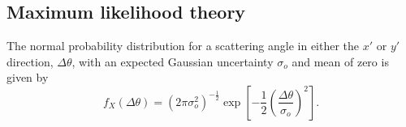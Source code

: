 \documentclass[a4paper,11pt]{article}
\begin{document}














\subsection{Maximum likelihood theory}\label{likelihood_theory_section}

The normal probability distribution for a scattering angle in either the $x'$ or $y'$ direction, $\Delta\theta$, with an expected Gaussian uncertainty $\sigma_o$ and mean of zero is given by
\begin{equation}
f_X(\Delta\theta) = (2\pi\sigma_o^2)^{-\frac{1}{2}}\exp\left[-\frac{1}{2}\left(\frac{\Delta\theta}{\sigma_o}\right)^2\right].
\end{equation}
\end{document}
